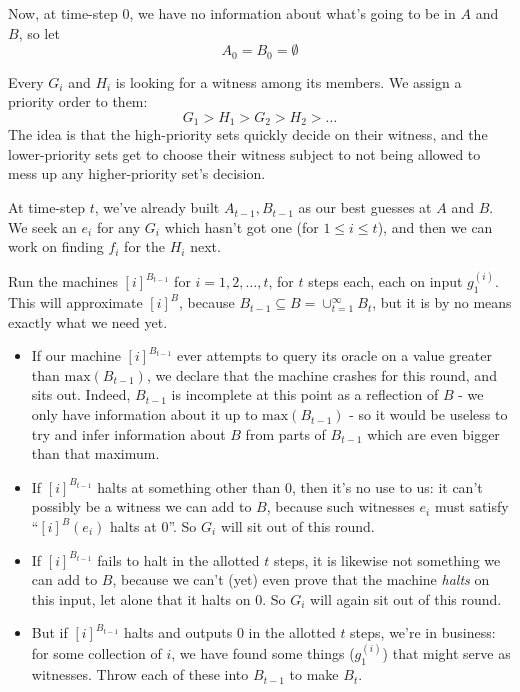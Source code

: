 \documentclass[11pt]{amsart}
\begin{document}
Now, at time-step $0$, we have no information about what's going to be in $A$ and $B$, so let $$A_0 = B_0 = \emptyset$$

Every $G_i$ and $H_i$ is looking for a witness among its members.
We assign a priority order to them: $$G_1 > H_1 > G_2 > H_2 > \dots$$
The idea is that the high-priority sets quickly decide on their witness, and the lower-priority sets get to choose their witness subject to not being allowed to mess up any higher-priority set's decision.

At time-step $t$, we've already built $A_{t-1}, B_{t-1}$ as our best guesses at $A$ and $B$.
We seek an $e_i$ for any $G_i$ which hasn't got one (for $1 \leq i \leq t$), and then we can work on finding $f_i$ for the $H_i$ next.

Run the machines $[i]^{B_{t-1}}$ for $i=1, 2, \dots, t$, for $t$ steps each, each on input $g^{(i)}_1$.
This will approximate $[i]^B$, because $B_{t-1} \subseteq B = \cup_{t=1}^{\infty} B_t$, but it is by no means exactly what we need yet.

\begin{itemize}
\item If our machine $[i]^{B_{t-1}}$ ever attempts to query its oracle on a value greater than $\text{max}(B_{t-1})$, we declare that the machine crashes for this round, and sits out.
Indeed, $B_{t-1}$ is incomplete at this point as a reflection of $B$ - we only have information about it up to $\text{max}(B_{t-1})$ - so it would be useless to try and infer information about $B$ from parts of $B_{t-1}$ which are even bigger than that maximum.

\item If $[i]^{B_{t-1}}$ halts at something other than $0$, then it's no use to us: it can't possibly be a witness we can add to $B$, because such witnesses $e_i$ must satisfy ``$[i]^B(e_i)$ halts at $0$''.
So $G_i$ will sit out of this round.

\item If $[i]^{B_{t-1}}$ fails to halt in the allotted $t$ steps, it is likewise not something we can add to $B$, because we can't (yet) even prove that the machine \emph{halts} on this input, let alone that it halts on $0$.
So $G_i$ will again sit out of this round.

\item But if $[i]^{B_{t-1}}$ halts and outputs $0$ in the allotted $t$ steps, we're in business: for some collection of $i$, we have found some things ($g^{(i)}_1$) that might serve as witnesses.
Throw each of these into $B_{t-1}$ to make $B_t$.
\end{itemize}
\end{document}
